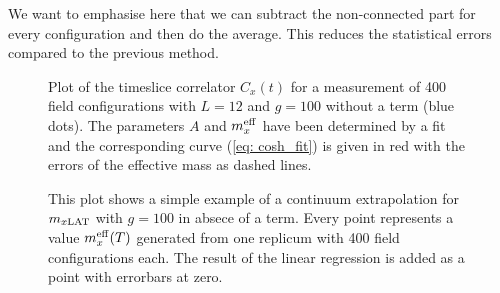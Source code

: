 %
%
%
We want to emphasise here that we can subtract the non-connected part for every configuration and then do the average. This reduces the statistical errors compared to the previous method.
%
%
%
\begin{figure}
\centering

\caption{Plot of the timeslice correlator $C_{x}(t)$ for a measurement of 400 field configurations with $L=12$ and $g=100$ without a  term (blue dots). The parameters $A$ and $m_{x}^{\rm eff}$ have been determined by a fit and the corresponding curve (\ref{eq: cosh_fit}) is given in red with the errors of the effective mass as dashed lines.\label{fig: coshcorr}}
\end{figure}
%
%
\begin{figure}
\centering

\caption{This plot shows a simple example of a continuum extrapolation for $m_{x\rm LAT}$ with $g=100$ in absece of a  term. Every point represents a value $m_{x}^{\rm eff}(T)$ generated from one replicum with 400 field configurations each. The result of the linear regression is added as a point with errorbars at zero. \label{fig: massfit_cosh}}
\end{figure}
%
%
%
%
%
%
%
%
%
